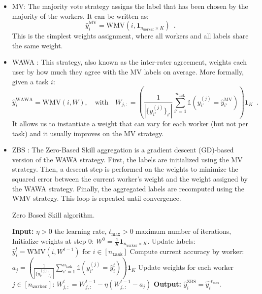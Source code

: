 \documentclass{cap2024}
\begin{document}
\begin{itemize}
  \item MV: The majority vote strategy assigns the label that has been chosen by the majority of the workers. It can be written as:
    \begin{equation}
      \label{eq:mv}
      \hat{y}_i^{\text{MV}} = \mathrm{WMV}(i,\mathbf{1}_{n_\texttt{worker}\times K})\enspace.
    \end{equation}
    This is the simplest weights assignment, where all workers and all labels share the same weight.
    \item WAWA \citep{appen_wawa_2021}: This strategy, also known as the inter-rater agreement, weights each user by how much they agree with the MV labels on average. More formally, given a task $i$:
    \begin{equation}
      \hat{y}_i^\text{WAWA}= \mathrm{WMV}\left(i,W\right),\quad
      \text{with}\quad W_{j,:} = \left(\frac{1}{|\{y_{i'}^{(j)}\}_{i'}|} \sum_{i'=1}^{n_{\mathrm{task}}} \mathds{1}\left(y_{i'}^{(j)} = \hat{y}_{i'}^\text{MV}\right)\right)\mathbf{1}_{K}\enspace.
    \end{equation}
    It allows us to instantiate a weight that can vary for each worker (but not per task) and it usually improves on the MV strategy.
    \item ZBS \citep{CrowdKit2023}: The Zero-Based Skill aggregation is a gradient descent (GD)-based version of the WAWA strategy.
    First, the labels are initialized using the MV strategy. Then, a descent step is performed on the weights to minimize the squared error between the current worker's weight and the weight assigned by the WAWA strategy. Finally, the aggregated labels are recomputed using the WMV strategy. This loop is repeated until convergence.
    \begin{algorithm}
      \caption{Zero Based Skill algorithm.}
      \begin{algorithmic}[1]
        \State \textbf{Input:} $\eta>0$ the learning rate, $t_{\max}>0$ maximum number of iterations,
      \State Initialize weights at step $0$: $W^0=\frac{1}{K} \mathbf{1}_{n_\texttt{worker}\times K}$.
            \State Update labels: $\hat{y}_i^{t} = \mathrm{WMV}(i, W^{t-1})$ for $i\in [n_\texttt{task}]$
            \State Compute current accuracy by worker: $a_j =\left(\frac{1}{|\{y_{i'}^{(j)}\}_{i'}|} \sum_{i'=1}^{n_{\mathrm{task}}} \mathds{1}\left(y_{i'}^{(j)} = \hat{y}_i^t\right)\right)\mathbf{1}_K$
            \State Update weights for each worker $j\in [n_\texttt{worker}]$: $W^t_{j,:} = W^{t-1}_{j, :} - \eta (W^{t-1}_{j,:}-a_j)$
        \EndFor
        \State \textbf{Output:} $\hat{y}_i^\text{ZBS} = \hat{y_i}^{t_{\max}}$.
      \end{algorithmic}
      \end{algorithm}


\end{itemize}
\end{document}
